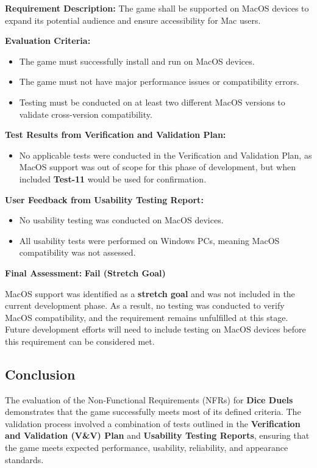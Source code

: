 \documentclass[12pt, titlepage]{article}
\begin{document}
\textbf{Requirement Description:}  
The game shall be supported on MacOS devices to expand its potential audience and ensure accessibility for Mac users.

\textbf{Evaluation Criteria:}  
\begin{itemize}
    \item The game must successfully install and run on MacOS devices.
    \item The game must not have major performance issues or compatibility errors.
    \item Testing must be conducted on at least two different MacOS versions to validate cross-version compatibility.
\end{itemize}

\textbf{Test Results from Verification and Validation Plan:}  
\begin{itemize}
    \item No applicable tests were conducted in the Verification and Validation Plan, as MacOS support was out of scope for this phase of development, but when included \textbf{Test-11} would be used for confirmation.
\end{itemize}

\textbf{User Feedback from Usability Testing Report:}  
\begin{itemize}
    \item No usability testing was conducted on MacOS devices.
    \item All usability tests were performed on Windows PCs, meaning MacOS compatibility was not assessed.
\end{itemize}

\textbf{Final Assessment:} \textbf{Fail (Stretch Goal)}  

MacOS support was identified as a \textbf{stretch goal} and was not included in the current development phase. As a result, no testing was conducted to verify MacOS compatibility, and the requirement remains unfulfilled at this stage. Future development efforts will need to include testing on MacOS devices before this requirement can be considered met.


\subsection{Conclusion}

The evaluation of the Non-Functional Requirements (NFRs) for \textbf{Dice Duels} demonstrates that the game successfully meets most of its defined criteria. The validation process involved a combination of tests outlined in the \textbf{Verification and Validation (V\&V) Plan} and \textbf{Usability Testing Reports}, ensuring that the game meets expected performance, usability, reliability, and appearance standards.
\end{document}
